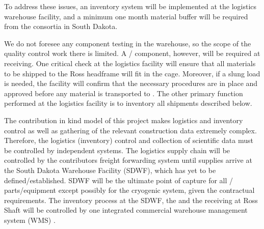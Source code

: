 To address these issues, an inventory system will be implemented at the logistics warehouse facility, and a minimum one month material buffer will be required from the consortia in South Dakota.

We do not foresee any component testing in the warehouse, so the scope of the quality control work there is limited. A / component, however, will be required at receiving. One critical  check at the logistics facility will ensure that all materials to be shipped to the Ross headframe will fit in the cage. Moreover, if a slung load is needed, the facility will confirm that the necessary procedures are in place and approved before any material is transported to . The other primary  function performed at the logistics facility is to inventory all shipments described below.

The contribution in kind model of this project makes logistics and inventory control as well as gathering of the relevant construction data extremely complex. Therefore, the logistics (inventory) control and collection of scientific data must be controlled by independent systems. 
The logistics supply chain will be controlled by the contributors freight forwarding system until supplies arrive at the South Dakota Warehouse Facility (SDWF), which has yet to be defined/established.  SDWF will be the ultimate point of capture for all / parts/equipment except possibly for the cryogenic system, given the contractual requirements.
The inventory process at the SDWF, the  and the  receiving at Ross Shaft will be controlled by one integrated commercial warehouse management system (WMS) . 


